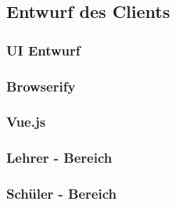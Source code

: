 \subsection{Entwurf des Clients}\label{sec:clientkonzept}
\subsubsection{UI Entwurf}\label{sec:uientwurf}
\subsubsection{Browserify}\label{sec:browserify}
\subsubsection{Vue.js}\label{sec:vuejs}
\subsubsection{Lehrer - Bereich}\label{sec:lehrerbereich}
\subsubsection{Schüler - Bereich}\label{sec:schuelerbereich}